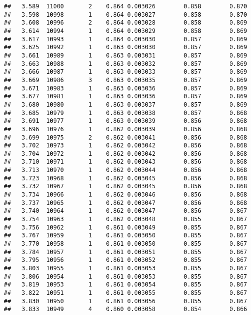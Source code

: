 \documentclass[
]{book}
\begin{document}
\begin{verbatim}
##   3.589  11000       2    0.864 0.003026        0.858        0.870
##   3.598  10998       1    0.864 0.003027        0.858        0.870
##   3.608  10996       2    0.864 0.003028        0.858        0.869
##   3.614  10994       1    0.864 0.003029        0.858        0.869
##   3.617  10993       1    0.864 0.003030        0.857        0.869
##   3.625  10992       1    0.863 0.003030        0.857        0.869
##   3.661  10989       1    0.863 0.003031        0.857        0.869
##   3.663  10988       1    0.863 0.003032        0.857        0.869
##   3.666  10987       1    0.863 0.003033        0.857        0.869
##   3.669  10986       3    0.863 0.003035        0.857        0.869
##   3.671  10983       1    0.863 0.003036        0.857        0.869
##   3.677  10981       1    0.863 0.003036        0.857        0.869
##   3.680  10980       1    0.863 0.003037        0.857        0.869
##   3.685  10979       1    0.863 0.003038        0.857        0.868
##   3.691  10977       1    0.863 0.003039        0.856        0.868
##   3.696  10976       1    0.862 0.003039        0.856        0.868
##   3.699  10975       2    0.862 0.003041        0.856        0.868
##   3.702  10973       1    0.862 0.003042        0.856        0.868
##   3.704  10972       1    0.862 0.003042        0.856        0.868
##   3.710  10971       1    0.862 0.003043        0.856        0.868
##   3.713  10970       1    0.862 0.003044        0.856        0.868
##   3.723  10968       1    0.862 0.003045        0.856        0.868
##   3.732  10967       1    0.862 0.003045        0.856        0.868
##   3.734  10966       1    0.862 0.003046        0.856        0.868
##   3.737  10965       1    0.862 0.003047        0.856        0.868
##   3.740  10964       1    0.862 0.003047        0.856        0.867
##   3.754  10963       1    0.862 0.003048        0.855        0.867
##   3.756  10962       1    0.861 0.003049        0.855        0.867
##   3.767  10959       1    0.861 0.003050        0.855        0.867
##   3.770  10958       1    0.861 0.003050        0.855        0.867
##   3.784  10957       1    0.861 0.003051        0.855        0.867
##   3.795  10956       1    0.861 0.003052        0.855        0.867
##   3.803  10955       1    0.861 0.003053        0.855        0.867
##   3.806  10954       1    0.861 0.003053        0.855        0.867
##   3.819  10953       1    0.861 0.003054        0.855        0.867
##   3.822  10951       1    0.861 0.003055        0.855        0.867
##   3.830  10950       1    0.861 0.003056        0.855        0.867
##   3.833  10949       4    0.860 0.003058        0.854        0.866

\end{verbatim}
\end{document}
